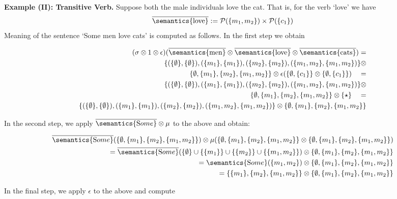 \bigskip
\noindent
{\bf Example (II): Transitive Verb.} Suppose both the male individuals love the cat. That is, for the verb `love' we have
\[
\overline{\semantics{\text{love}}} := {\cal P}(\{m_1, m_2\}) \times {\cal P}(\{c_1\})
\] 
Meaning of the sentence `Some men love cats' is computed as follows. In the first step we obtain

\begin{align*}
(\sigma \otimes 1 \otimes \epsilon)(\overline{\semantics{\text{men}}} \otimes \overline{\semantics{\text{love}}} \otimes \overline{\semantics{\text{cats}}}) =\\
   \{(\{\emptyset\}, \{\emptyset\}), (\{m_1\}, \{m_1\}), (\{m_2\}, \{m_2\}), (\{m_1, m_2\}, \{m_1, m_2\}) \} \otimes\\
   \{\emptyset, \{m_1\}, \{m_2\}, \{m_1, m_2\}\} \otimes \epsilon(\{\emptyset, \{c_1\}\} \otimes \{\emptyset, \{c_1\}\}) \quad = \\
     \{(\{\emptyset\}, \{\emptyset\}), (\{m_1\}, \{m_1\}), (\{m_2\}, \{m_2\}), (\{m_1, m_2\}, \{m_1, m_2\}) \} \otimes\\
   \{\emptyset, \{m_1\}, \{m_2\}, \{m_1, m_2\}\} \otimes  \{\star\} \quad = \\
     \{(\{\emptyset\}, \{\emptyset\}), (\{m_1\}, \{m_1\}), (\{m_2\}, \{m_2\}), (\{m_1, m_2\}, \{m_1, m_2\}) \} \otimes
   \{\emptyset, \{m_1\}, \{m_2\}, \{m_1, m_2\}\}  
\end{align*}

\noindent
In the second step, we apply $\overline{\semantics{\text Some}} \otimes \mu$ to the above and obtain:

\begin{align*}
\overline{\semantics{\text Some}} (\{\emptyset, \{m_1\}, \{m_2\}, \{m_1, m_2\}\}) \otimes \mu(\{\emptyset, \{m_1\}, \{m_2\}, \{m_1, m_2\}\} \otimes \{\emptyset, \{m_1\}, \{m_2\}, \{m_1, m_2\}\})\\
=
\overline{\semantics{\text Some}} (\{\emptyset\} \cup  \{\{m_1\}\} \cup \{\{m_2\}\} \cup  \{\{m_1, m_2\}\})  \otimes \{\emptyset, \{m_1\}, \{m_2\}, \{m_1, m_2\}\}\\
= \semantics{\text Some}(\{m_1, m_2\})  \otimes \{\emptyset, \{m_1\}, \{m_2\}, \{m_1, m_2\}\}\\
=\{\{m_1\}, \{m_2\}, \{m_1,m_2\}\} \otimes   \{\emptyset, \{m_1\}, \{m_2\}, \{m_1, m_2\}\}\\
\end{align*}

\noindent
In the final step, we apply $\epsilon$ to the above and compute

